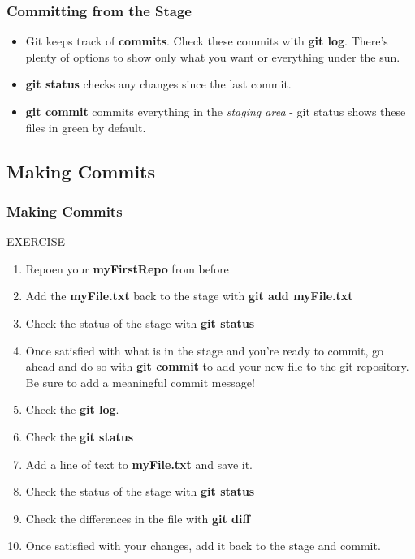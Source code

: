 \documentclass{beamer}
\begin{document}
\begin{frame}[fragile]
\frametitle{Committing from the Stage}
\begin{itemize}
\item Git keeps track of \textbf{commits}. Check these commits with \textbf{git log}. There's plenty of options to show only what you want or everything under the sun. 
\item \textbf{git status} checks any changes since the last commit.
\item \textbf{git commit} commits everything in the \textit{staging area} - git status shows these files in {\color{dkgreen}green} by default.
\end{itemize}
\end{frame}

\subsection{Making Commits}

\begin{frame}[fragile]
\frametitle{Making Commits}
    \begin{block}{EXERCISE}
        \begin{enumerate}
        \item Repoen your \textbf{myFirstRepo} from before
	 \item Add the \textbf{myFile.txt} back to the stage with \textbf{git add myFile.txt}
	 \item Check the status of the stage with \textbf{git status}
        \item Once satisfied with what is in the stage and you're ready to commit, go ahead and do so with \textbf{git commit} to add your new file to the git repository. Be sure to add a meaningful commit message!
        \item Check the \textbf{git log}.
	 \item Check the \textbf{git status}
 	 \item Add a line of text to \textbf{myFile.txt} and save it.
	 \item Check the status of the stage with \textbf{git status}
	 \item Check the differences in the file with \textbf{git diff}
	 \item Once satisfied with your changes, add it back to the stage and commit. 
        \end{enumerate}
    \end{block}
\end{frame}
\end{document}
